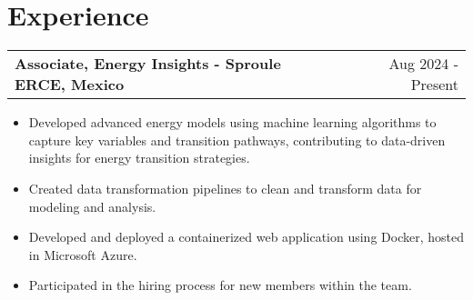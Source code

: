 \documentclass[a4paper,10pt]{article}
\makeatletter
\newenvironment{joblong}[2]
    {
    \begin{tabularx}{\linewidth}{@{}l X r@{}}
    \textbf{#1} & \hfill &  #2 \\[3.75pt]
    \end{tabularx}
    \begin{minipage}[t]{\linewidth}
    \begin{itemize}[nosep,after=\strut, leftmargin=1em, itemsep=3pt,label=--]
    }
    {
    \end{itemize}
    \end{minipage}    
    }
\makeatother
\begin{document}

\section{Experience}

\begin{joblong}{Associate, Energy Insights - Sproule ERCE, Mexico}{Aug 2024 - Present}
    \item Developed advanced energy models using machine learning algorithms to capture key variables and transition pathways, contributing to data-driven insights for energy transition strategies.
    \item Created data transformation pipelines to clean and transform data for modeling and analysis.
    \item Developed and deployed a containerized web application using Docker, hosted in Microsoft Azure.
    \item Participated in the hiring process for new members within the team.
\end{joblong}

\end{document}
